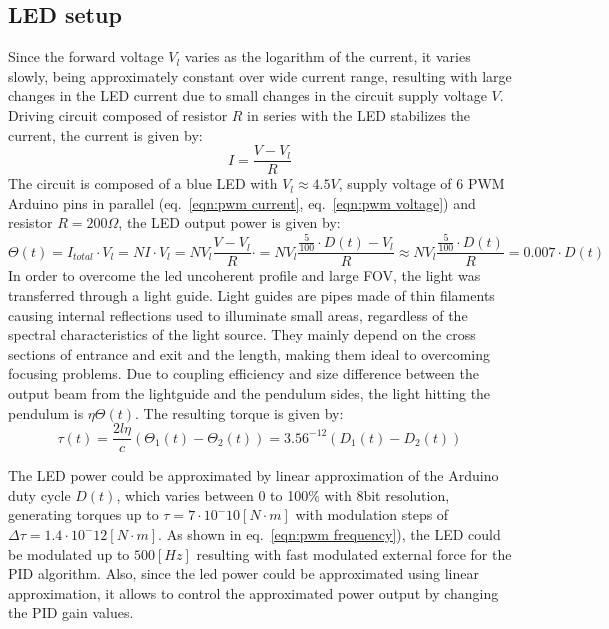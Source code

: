 \documentclass[\main/master.tex]{subfiles}
\begin{document}
\subsection{LED setup}
Since the forward voltage $V_l$ varies as the logarithm of the current, it varies slowly, being approximately constant over wide current range, resulting with large changes in the LED current due to small changes in the circuit supply voltage $V$. Driving circuit composed of resistor $R$ in series with the LED stabilizes the current, the current is given by:
\begin{equation}
I =\frac{V-V_l}{R} \label{eqn:led circuit}
\end{equation}
The circuit is composed of a blue LED with $V_l\approx 4.5V$, supply voltage of 6 PWM Arduino pins in parallel (eq.~\ref{eqn:pwm current}, eq.~\ref{eqn:pwm voltage}) and resistor $R = 200\Omega$, the LED output power is given by:
\begin{equation}
\Theta(t) = I_{total}\cdot V_l = NI\cdot V_l = N V_l \frac{V-V_l}{R}\cdot  =N V_l\frac{\frac{5}{100}\cdot D(t)-V_l}{R} \approx N V_l\frac{\frac{5}{100}\cdot D(t)}{R} = 0.007\cdot D(t) \label{eqn:led power}
\end{equation}
In order to overcome the led uncoherent profile and large FOV, the light was transferred through a light guide. Light guides are pipes made of thin filaments causing internal reflections used  to illuminate small areas, regardless of the spectral characteristics of the light source. They mainly depend on the cross sections of entrance and exit and the length, making them ideal to overcoming focusing problems. Due to coupling efficiency and size difference between the output beam from the lightguide and the pendulum sides, the light hitting the pendulum is $\eta\Theta(t)$. The resulting torque is given by:
\begin{equation}
\tau(t)  =\frac{2l\eta}{{c}} (\Theta_1(t) -\Theta_2(t)) = 3.56^{-12}(D_1(t) -D_2(t)) 
\label{eqn:led tourqe}
\end{equation}
\par\noindent
The LED power could be approximated by linear approximation of the Arduino duty cycle $D(t)$, which varies between 0 to 100\% with 8bit resolution, generating torques up to $\tau = 7\cdot10^-{10} [N\cdot m]$ with modulation steps of $\Delta\tau = 1.4\cdot10^-{12} [N\cdot m]$. As shown in eq.~\ref{eqn:pwm frequency}), the LED could be modulated up to $500[Hz]$ resulting with fast modulated external force for the PID algorithm. Also, since the led power could be approximated using linear approximation, it allows to control the approximated power output by changing the PID gain values.  
\end{document}
